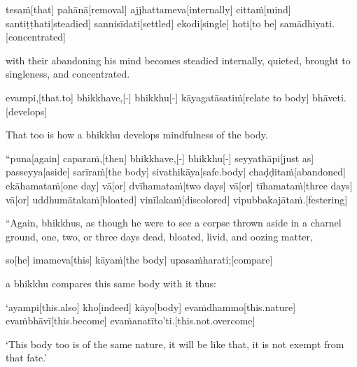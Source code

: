 \begin{samepage}
\begingl[glneveryline={\PaliGlossA,\PaliGlossB}]
tesaṁ[that] pahānā[removal] ajjhattameva[internally] cittaṁ[mind] santiṭṭhati[steadied] sannisīdati[settled] ekodi[single] hoti[to be] samādhiyati.[concentrated]
\endgl
\nopagebreak
\linespread{0.5}
\begin{spacin}{0.2}
{\PaliGlossFT with their abandoning his mind becomes steadied internally, quieted, brought to singleness, and concentrated.}
\end{spacin}
\vskip 12pt
\end{samepage}
\begin{samepage}
\begingl[glneveryline={\PaliGlossA,\PaliGlossB}]
evampi,[that.to] bhikkhave,[-] bhikkhu[-] kāyagatāsatiṁ[relate to body] bhāveti.[develops]
\endgl
\nopagebreak
\linespread{0.5}
\begin{spacin}{0.2}
{\PaliGlossFT That too is how a bhikkhu develops mindfulness of the body.}
\end{spacin}
\vskip 12pt
\end{samepage}
\vskip 0.05in
\begin{samepage}
\begingl[glneveryline={\PaliGlossA,\PaliGlossB}]
“puna[again] caparaṁ,[then] bhikkhave,[-] bhikkhu[-] seyyathāpi[just as] passeyya[aside] sarīraṁ[the body] sivathikāya[safe.body] chaḍḍitaṁ[abandoned] ekāhamataṁ[one day] vā[or] dvīhamataṁ[two days] vā[or] tīhamataṁ[three days] vā[or] uddhumātakaṁ[bloated] vinīlakaṁ[discolored] vipubbakajātaṁ.[festering]
\endgl
\nopagebreak
\linespread{0.5}
\begin{spacin}{0.2}
{\PaliGlossFT “Again, bhikkhus, as though he were to see a corpse thrown aside in a charnel ground, one, two, or three days dead, bloated, livid, and oozing matter,}
\end{spacin}
\vskip 12pt
\end{samepage}
\begin{samepage}
\begingl[glneveryline={\PaliGlossA,\PaliGlossB}]
so[he] imameva[this] kāyaṁ[the body] upasaṁharati;[compare]
\endgl
\nopagebreak
\linespread{0.5}
\begin{spacin}{0.2}
{\PaliGlossFT a bhikkhu compares this same body with it thus:}
\end{spacin}
\vskip 12pt
\end{samepage}
\begin{samepage}
\begingl[glneveryline={\PaliGlossA,\PaliGlossB}]
‘ayampi[this.also] kho[indeed] kāyo[body] evaṁdhammo[this.nature] evaṁbhāvī[this.become] evaṁanatīto’ti.[this.not.overcome]
\endgl
\nopagebreak
\linespread{0.5}
\begin{spacin}{0.2}
{\PaliGlossFT ‘This body too is of the same nature, it will be like that, it is not exempt from that fate.’}
\end{spacin}
\vskip 12pt
\end{samepage}
